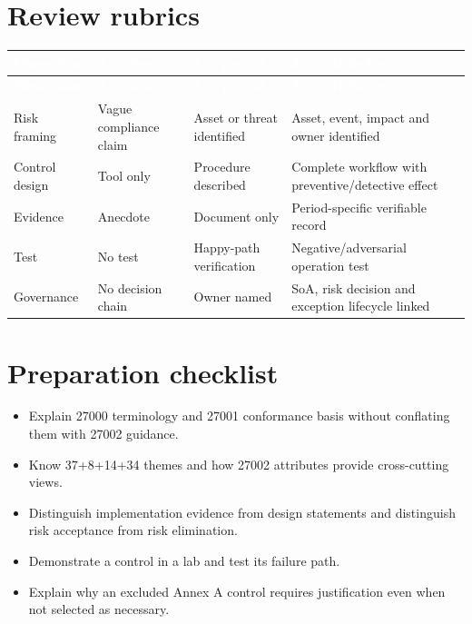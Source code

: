 \documentclass[11pt,letterpaper]{article}
\begin{document}
\section{Review rubrics}
\small{}\begin{longtable}{>{\raggedright\arraybackslash}p{}>{\raggedright\arraybackslash}p{}>{\raggedright\arraybackslash}p{}>{\raggedright\arraybackslash}p{}}
\rowcolor{navy} \textcolor{white}{\textbf{Dimension}} & \textcolor{white}{\textbf{0 = absent}} & \textcolor{white}{\textbf{1 = partial}} & \textcolor{white}{\textbf{2 = satisfactory}}\\
\endfirsthead
\rowcolor{navy} \textcolor{white}{\textbf{Dimension}} & \textcolor{white}{\textbf{0 = absent}} & \textcolor{white}{\textbf{1 = partial}} & \textcolor{white}{\textbf{2 = satisfactory}}\\
\endhead
Risk framing & Vague compliance claim & Asset or threat identified & Asset, event, impact and owner identified\\
Control design & Tool only & Procedure described & Complete workflow with preventive/detective effect\\
Evidence & Anecdote & Document only & Period-specific verifiable record\\
Test & No test & Happy-path verification & Negative/adversarial operation test\\
Governance & No decision chain & Owner named & SoA, risk decision and exception lifecycle linked\\
\end{longtable}\normalsize

\section{Preparation checklist}
\begin{itemize}
\item Explain 27000 terminology and 27001 conformance basis without conflating them with 27002 guidance.
\item Know 37+8+14+34 themes and how 27002 attributes provide cross-cutting views.
\item Distinguish implementation evidence from design statements and distinguish risk acceptance from risk elimination.
\item Demonstrate a control in a lab and test its failure path.
\item Explain why an excluded Annex A control requires justification even when not selected as necessary.
\end{itemize}
\end{document}
